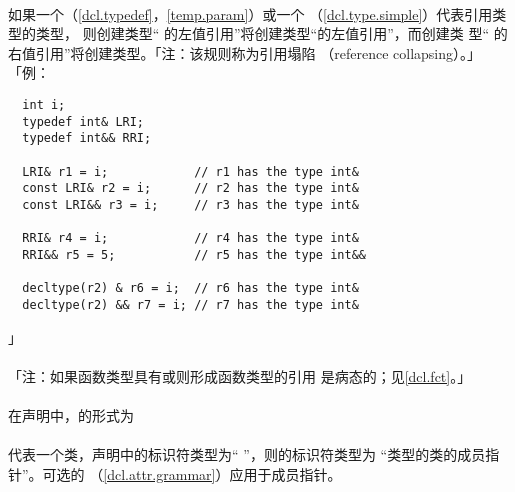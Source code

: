 \paragraph{}
如果一个（\ref{dcl.typedef}，\ref{temp.param}）或一个
（\ref{dcl.type.simple}）代表引用类型的类型，
则创建类型`` 的左值引用''将创建类型``的左值引用''，而创建类
型`` 的右值引用''将创建类型。「注：该规则称为引用塌陷
（reference collapsing）。」
「例：
\begin{lstlisting}
  int i;
  typedef int& LRI;
  typedef int&& RRI;

  LRI& r1 = i;            // r1 has the type int&
  const LRI& r2 = i;      // r2 has the type int&
  const LRI&& r3 = i;     // r3 has the type int&

  RRI& r4 = i;            // r4 has the type int&
  RRI&& r5 = 5;           // r5 has the type int&&

  decltype(r2) & r6 = i;  // r6 has the type int&
  decltype(r2) && r7 = i; // r7 has the type int&
\end{lstlisting}」

\paragraph{}
「注：如果函数类型具有或则形成函数类型的引用
是病态的；见\ref{dcl.fct}。」

\paragraph{}
在声明中，的形式为                                              \\
\mbox{\qquad{} \tm{*}
  }  \\
代表一个类，声明中的标识符类型为``
 ''，则的标识符类型为
``类型的类的成员指针''。可选的
（\ref{dcl.attr.grammar}）应用于成员指针。


